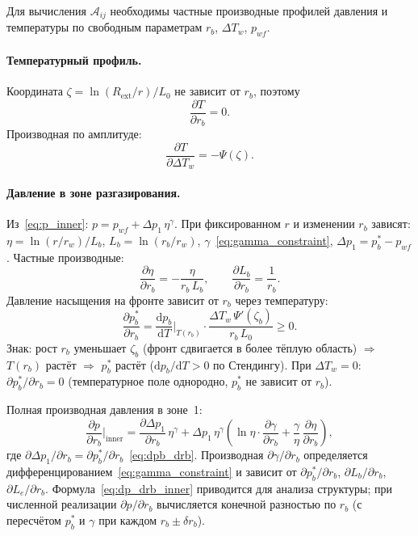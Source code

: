 \documentclass[12pt,a4paper]{article}
\newcommand{\dd}{\mathrm{d}}
\newcommand{\pp}{\partial}
\newcommand{\ext}{\mathrm{ext}}
\begin{document}
Для вычисления $\mathcal{A}_{ij}$ необходимы частные
производные профилей давления и температуры по
свободным параметрам $r_b$, $\Delta T_w$, $p_{wf}$.

\paragraph{Температурный профиль.}
Координата $\zeta = \ln(R_\ext/r)/L_0$ не зависит от $r_b$,
поэтому
\begin{equation}\label{eq:dT_drb}
  \frac{\pp T}{\pp r_b} = 0.
\end{equation}
Производная по амплитуде:
\begin{equation}\label{eq:dT_dTw}
  \frac{\pp T}{\pp \Delta T_w} = -\Psi(\zeta).
\end{equation}

\paragraph{Давление в зоне разгазирования.}
Из~\eqref{eq:p_inner}: $p = p_{wf} + \Delta p_1\,\eta^\gamma$.
При фиксированном $r$ и изменении $r_b$ зависят:
$\eta = \ln(r/r_w)/L_b$, $L_b = \ln(r_b/r_w)$,
$\gamma$~\eqref{eq:gamma_constraint},
$\Delta p_1 = p_b^* - p_{wf}$.
Частные производные:
\begin{equation}\label{eq:deta_drb}
  \frac{\pp\eta}{\pp r_b} = -\frac{\eta}{r_b\,L_b},
  \qquad
  \frac{\pp L_b}{\pp r_b} = \frac{1}{r_b}.
\end{equation}
Давление насыщения на фронте зависит от $r_b$
через температуру:
\begin{equation}\label{eq:dpb_drb}
  \frac{\pp p_b^*}{\pp r_b}
  = \frac{\dd p_b}{\dd T}\bigg|_{T(r_b)}
    \cdot \frac{\Delta T_w\,\Psi'(\zeta_b)}{r_b\,L_0} \geqslant 0.
\end{equation}
Знак: рост $r_b$ уменьшает $\zeta_b$ (фронт сдвигается
в более тёплую область) $\Rightarrow$ $T(r_b)$ растёт
$\Rightarrow$ $p_b^*$ растёт ($\dd p_b/\dd T > 0$
по Стендингу). При $\Delta T_w = 0$: $\pp p_b^*/\pp r_b = 0$
(температурное поле однородно, $p_b^*$ не зависит от $r_b$).

Полная производная давления в зоне~1:
\begin{equation}\label{eq:dp_drb_inner}
  \frac{\pp p}{\pp r_b}\bigg|_\text{inner}
  = \frac{\pp\Delta p_1}{\pp r_b}\,\eta^\gamma
    + \Delta p_1\,\eta^\gamma\!\left(
      \ln\eta\cdot\frac{\pp\gamma}{\pp r_b}
      + \frac{\gamma}{\eta}\,\frac{\pp\eta}{\pp r_b}
    \right),
\end{equation}
где $\pp\Delta p_1/\pp r_b = \pp p_b^*/\pp r_b$~\eqref{eq:dpb_drb}.
Производная $\pp\gamma/\pp r_b$ определяется
дифференцированием~\eqref{eq:gamma_constraint}
и зависит от $\pp p_b^*/\pp r_b$, $\pp L_b/\pp r_b$,
$\pp L_e/\pp r_b$. Формула~\eqref{eq:dp_drb_inner}
приводится для анализа структуры; при численной
реализации $\pp p/\pp r_b$ вычисляется конечной
разностью по $r_b$ (с пересчётом $p_b^*$ и $\gamma$
при каждом $r_b \pm \delta r_b$).
\end{document}
